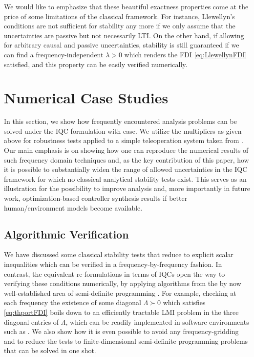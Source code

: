 We would like to emphasize that these beautiful exactness properties come at the price of some limitations 
of the classical framework. For instance, Llewellyn's conditions are not sufficient for stability any more 
if we only assume that the uncertainties are passive but not necessarily LTI. On the other hand, if allowing 
for arbitrary causal and passive uncertainties, stability is still guaranteed if we can find a 
frequency-independent $\lambda>0$ which renders the FDI \eqref{eq:LlewellynFDI} satisfied, and this property 
can be easily verified numerically.




\section{Numerical Case Studies}\label{sec:num}
In this section, we show how frequently encountered analysis problems can be solved 
under the IQC formulation with ease. We utilize the multipliers as given above for  
robustness tests applied to a simple teleoperation system taken from \cite{willaert,
willaertIJRR10}. Our main emphasis is on showing how one can reproduce the numerical 
results of such frequency domain techniques and, as the key contribution of this paper, 
how it is possible to substantially widen the range of allowed uncertainties in the 
IQC framework for which no classical analytical stability tests exist. This serves as 
an illustration for the possibility to improve analysis and, more importantly in 
future work, optimization-based controller synthesis results if better human/environment 
models become available.

\subsection{Algorithmic Verification}\label{sec:algver}

We have discussed some classical stability tests that reduce to explicit scalar 
inequalities which can be verified in a frequency-by-frequency fashion. In contrast, 
the equivalent re-formulations in terms of IQCs open the way to verifying these conditions 
numerically, by applying algorithms from the by now well-established area of semi-definite 
programming \cite{lmiboydbook}. For example, checking at each frequency the existence of 
some diagonal $\Lambda\succ 0$ which satisfies \eqref{eq:thportFDI} boils down to an 
efficiently tractable LMI problem in the three diagonal entries of $\Lambda$, which 
can be readily implemented in software environments such as \cite{yalmip}. We also 
show how it is even possible to avoid any frequency-gridding and to reduce the tests 
to finite-dimensional semi-definite programming problems that can be solved in one shot.

